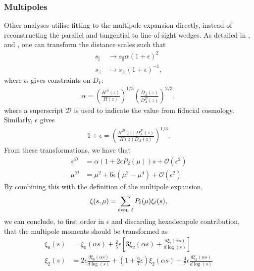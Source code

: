 \documentclass[titlesmallcaps, examinerscopy, copyrightpage]{uqthesis}
\begin{document}
\subsubsection{Multipoles} \label{sec:prior:cor:mp}

Other analyses utilise fitting to the multipole expansion directly, instead of reconstructing the parallel and tangential to line-of-sight wedges. As detailed in \citet{PadmanabhanWhite2008}, \citet{KazinSanchezBlanton2012} and \citet{XuCuesta2013}, one can transform the distance scales such that
\begin{align}
s_\parallel &\rightarrow s_\parallel \alpha (1 + \epsilon)^2 \\
s_\perp &\rightarrow s_\perp (1 + \epsilon)^{-1},
\end{align}
where $\alpha$ gives constraints on $D_V$:
\begin{align}
\alpha = \left( \frac{H^{\mathcal{D}}(z)}{H(z)}\right) ^{1/3} \left( \frac{D_A(z)}{D_A^{\mathcal{D}}(z)} \right)^{2/3},
\end{align}
where a superscript $\mathcal{D}$ is used to indicate the value from fiducial cosmology. Similarly, $\epsilon$ gives
\begin{align}
1 + \epsilon = \left( \frac{H^{\mathcal{D}}(z) D_A^{\mathcal{D}}(z)}{H(z) D_A(z)} \right) ^{1/3}.
\end{align}
From these transformations, we have that
\begin{align}
s^\mathcal{D} &= \alpha (1 + 2\epsilon P_2(\mu)) s + \mathcal{O}(\epsilon^2) \\
\mu^\mathcal{D} &= \mu^2 + 6 \epsilon (\mu^2 - \mu^4) + \mathcal{O}(\epsilon^2)
\end{align}
By combining this with the definition of the multipole expansion,
\begin{align}
\xi(s, \mu) = \sum\limits_{\rm{even }\ \ell} P_\ell(\mu) \xi_\ell(s),
\end{align}
we can conclude, to first order in $\epsilon$ and discarding hexadecapole contribution, that the multipole moments should be transformed as \citep{KazinSanchezBlanton2012}
\begin{align}
\xi_0(s) &= \xi_0(\alpha s) + \frac{2}{5}\epsilon \left[ 3 \xi_2(\alpha s) + \frac{d \xi_2(\alpha s)}{d \log(s)}\right] \label{eq:ximp}\\
\xi_2(s) &= 2\epsilon \frac{d \xi_0(\alpha s)}{d\log(s)} + \left( 1 + \frac{6}{7}\epsilon\right) \xi_2(\alpha s) + \frac{4}{7} \epsilon \frac{d \xi_2(\alpha s)}{d \log(s)} \label{eq:multipoles} 
\end{align}
\end{document}
